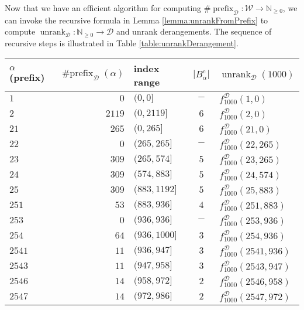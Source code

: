 Now that we have an efficient algorithm for computing
$\#\operatorname{prefix}_\mathcal{D} \colon \mathcal{W} \rightarrow \mathbb{N}_{\geq 0}$,
we can invoke the recursive formula in Lemma \ref{lemma:unrankFromPrefix} to
compute
$\operatorname{unrank}_\mathcal{D} \colon \mathbb{N}_{\geq 0} \rightarrow \mathcal{D}$
and unrank derangements.
The sequence of recursive steps is illustrated in
Table \ref{table:unrankDerangement}.
\begin{table}
\center
\begin{tabular}{|l|r|l|c|l|}
  \hline
  $\alpha$ (prefix)
    & $\operatorname{\#prefix}_\mathcal{D}(\alpha)$
    & index range
    & $|B_\alpha^c|$
    & $\operatorname{unrank}_\mathcal{D}(1000)$
  \\ \hline
  $1       $ & $0$    & $(0,0]$           & $-$ & $f^{\mathcal{D}}_{1000}(1, 0)$          \\
  $2       $ & $2119$ & $(0,2119]$        & $6$ & $f^{\mathcal{D}}_{1000}(2, 0)$          \\
  \hline
  $21      $ & $265$  & $(0, 265]$        & $6$ & $f^{\mathcal{D}}_{1000}(21, 0)$         \\
  $22      $ & $0$    & $(265, 265]$      & $-$ & $f^{\mathcal{D}}_{1000}(22, 265)$       \\
  $23      $ & $309$  & $(265, 574]$      & $5$ & $f^{\mathcal{D}}_{1000}(23, 265)$       \\
  $24      $ & $309$  & $(574, 883]$      & $5$ & $f^{\mathcal{D}}_{1000}(24, 574)$       \\
  $25      $ & $309$  & $(883, 1192]$     & $5$ & $f^{\mathcal{D}}_{1000}(25, 883)$       \\
  \hline
  $251     $ & $53$   & $(883, 936]$      & $4$ & $f^{\mathcal{D}}_{1000}(251, 883)$      \\
  $253     $ & $0$    & $(936, 936]$      & $-$ & $f^{\mathcal{D}}_{1000}(253, 936)$      \\
  $254     $ & $64$   & $(936, 1000]$     & $3$ & $f^{\mathcal{D}}_{1000}(254, 936)$      \\
  \hline
  $2541    $ & $11$   & $(936, 947]$      & $3$ & $f^{\mathcal{D}}_{1000}(2541, 936)$     \\
  $2543    $ & $11$   & $(947, 958]$      & $3$ & $f^{\mathcal{D}}_{1000}(2543, 947)$     \\
  $2546    $ & $14$   & $(958, 972]$      & $2$ & $f^{\mathcal{D}}_{1000}(2546, 958)$     \\
  $2547    $ & $14$   & $(972, 986]$      & $2$ & $f^{\mathcal{D}}_{1000}(2547, 972)$     \\

\end{tabular}
\end{table}
